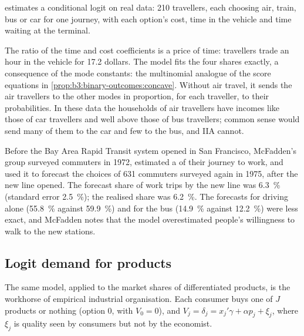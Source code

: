  estimates a conditional logit on real
data: 210 travellers, each choosing air, train, bus or car for one journey,
with each option's cost, time in the vehicle and time waiting at the terminal.

\label{lst:b3:binary-outcomes:travel}

\label{out:b3:binary-outcomes:travel}

The ratio of the time and cost coefficients is a price of time: travellers
trade an hour in the vehicle for 17.2 dollars. %
The model fits the four shares exactly, a consequence of the mode constants:
the multinomial analogue of the score equations in
\cref{prop:b3:binary-outcomes:concave}. Without air travel, it sends the air
travellers to the other modes in proportion, for each traveller, to their
probabilities. In these data the households of air travellers have incomes
like those of car travellers and well above those of bus travellers; common
sense would send many of them to the car and few to the bus, and IIA cannot.

\begin{record}
Before the Bay Area Rapid Transit system opened in San Francisco, McFadden's
group surveyed commuters in 1972, estimated a  of their
journey to work, and used it to forecast the choices of 631 commuters surveyed
again in 1975, after the new line opened. The forecast share of work trips by
the new line was 6.3~\% (standard error 2.5~\%); the realised share was
6.2~\%. %
The forecasts for driving alone (55.8~\% against 59.9~\%) and for the bus
(14.9~\% against 12.2~\%) were less exact, and McFadden notes that the model
overestimated people's willingness to walk to the new stations.
\end{record}

\subsection*{Logit demand for products}

The same model, applied to the market shares of differentiated products, is the
workhorse of empirical industrial organisation. Each consumer buys one of $J$
products or nothing (option 0, with $V_0 = 0$), and $V_j = \delta_j = x_j'\gamma
+ \alpha p_j + \xi_j$, where $\xi_j$ is quality seen by consumers but not by the
economist.

